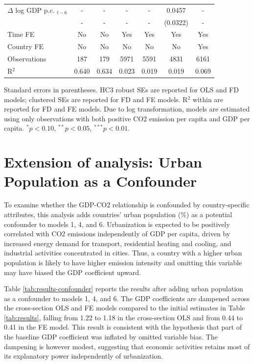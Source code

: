 \documentclass[12pt, a4paper]{article}
\begin{document}
\begin{table}[H]
\begin{threeparttable}
\begin{tabularx}{\textwidth}{Xcccccc}
$\Delta$ log GDP p.c. $_{t-6}$  & - & - & - & - & 0.0457 & -\\
                                & - & - & - & - & (0.0322) & -\\[0.3em]                                                              
\midrule
Time FE                 & No & No & Yes & Yes & Yes & Yes \\
Country FE              & No & No & No  & No  & No  & Yes \\
Observations            & 187   & 179   & 5971  & 5591  & 4831  & 6161   \\
R$^2$                   & 0.640 & 0.634 & 0.023 & 0.019 & 0.019 & 0.069 \\
\bottomrule
\end{tabularx}
\begin{tablenotes}
\small
\item Standard errors in parentheses. HC3 robust SEs are reported for OLS and FD models; clustered SEs are reported for FD and FE models. R$^2$ within are reported for FD and FE models. Due to log transformation, models are estimated using only observations with both positive CO2 emission per capita and GDP per capita. $^{*}p<0.10$, $^{**}p<0.05$, $^{***}p<0.01$.
\end{tablenotes}
\end{threeparttable}
\end{table}

\section{Extension of analysis: Urban Population as a Confounder}

To examine whether the GDP-CO2 relationship is confounded by country-specific attributes, this analysis adds countries' urban population (\%) as a potential confounder to models 1, 4, and 6. Urbanization is expected to be positively correlated with CO2 emissions independently of GDP per capita, driven by increased energy demand for transport, residential heating and cooling, and industrial activities concentrated in cities. Thus, a country with a higher urban population is likely to have higher emission intensity and omitting this variable may have biased the GDP coefficient upward.

Table \ref{tab:results-confounder} reports the results after adding urban population as a confounder to models 1, 4, and 6. The GDP coefficients are dampened across the cross-section OLS and FE models compared to the initial estimates in Table \ref{tab:results}, falling from 1.22 to 1.18 in the cross-section OLS and from 0.44 to 0.41 in the FE model. This result is consistent with the hypothesis that part of the baseline GDP coefficient was inflated by omitted variable bias. The dampening is however modest, suggesting that economic activities retains most of its explanatory power independently of urbanization.
\end{document}
